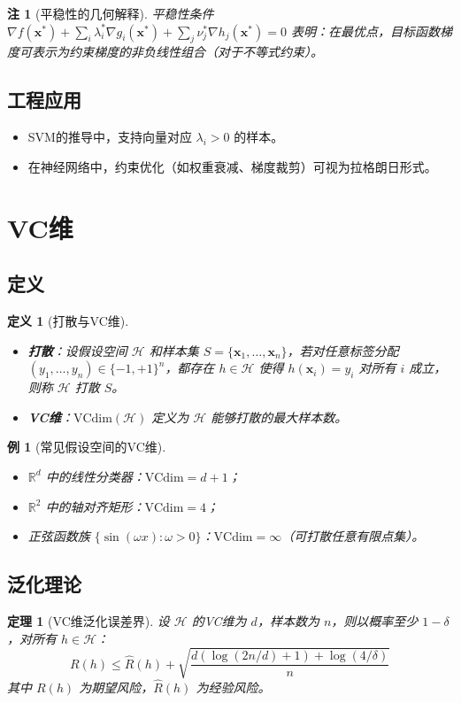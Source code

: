 \documentclass[UTF8, 10pt]{ctexart}
\newtheorem{theorem}{定理}[section]
\newtheorem{definition}{定义}[section]
\newtheorem{example}{例}[section]
\newtheorem{remark}{注}[section]
\newcommand{\R}{\mathbb{R}}
\begin{document}
\begin{remark}[平稳性的几何解释]
平稳性条件 $\nabla f(\bm{x}^*) + \sum_i \lambda_i^* \nabla g_i(\bm{x}^*) + \sum_j \nu_j^* \nabla h_j(\bm{x}^*) = 0$ 表明：在最优点，目标函数梯度可表示为约束梯度的非负线性组合（对于不等式约束）。
\end{remark}

\subsection{工程应用}
\begin{itemize}
    \item SVM的推导中，支持向量对应 $\lambda_i>0$ 的样本。
    \item 在神经网络中，约束优化（如权重衰减、梯度裁剪）可视为拉格朗日形式。
\end{itemize}

\section{VC维}
\subsection{定义}
\begin{definition}[打散与VC维]
\begin{itemize}
    \item \textbf{打散}：设假设空间 $\mathcal{H}$ 和样本集 $S = \{\bm{x}_1, \ldots, \bm{x}_n\}$，若对任意标签分配 $(y_1, \ldots, y_n) \in \{-1, +1\}^n$，都存在 $h \in \mathcal{H}$ 使得 $h(\bm{x}_i) = y_i$ 对所有 $i$ 成立，则称 $\mathcal{H}$ 打散 $S$。
    \item \textbf{VC维}：$\text{VCdim}(\mathcal{H})$ 定义为 $\mathcal{H}$ 能够打散的最大样本数。
\end{itemize}
\end{definition}

\begin{example}[常见假设空间的VC维]
\begin{itemize}
    \item $\R^d$ 中的线性分类器：$\text{VCdim} = d + 1$；
    \item $\R^2$ 中的轴对齐矩形：$\text{VCdim} = 4$；
    \item 正弦函数族 $\{\sin(\omega x) : \omega > 0\}$：$\text{VCdim} = \infty$（可打散任意有限点集）。
\end{itemize}
\end{example}

\subsection{泛化理论}
\begin{theorem}[VC维泛化误差界]
设 $\mathcal{H}$ 的VC维为 $d$，样本数为 $n$，则以概率至少 $1 - \delta$，对所有 $h \in \mathcal{H}$：
\[
R(h) \le \hat{R}(h) + \sqrt{\frac{d(\log(2n/d) + 1) + \log(4/\delta)}{n}}
\]
其中 $R(h)$ 为期望风险，$\hat{R}(h)$ 为经验风险。
\end{theorem}
\end{document}
